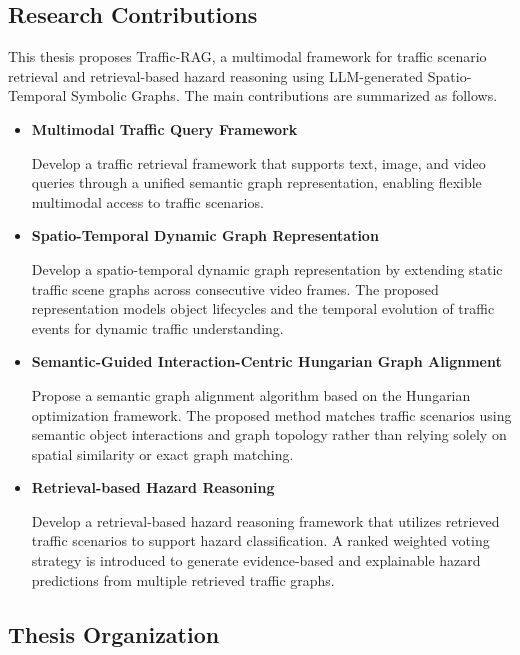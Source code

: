 \documentclass[a4paper, 11pt]{article} %
\begin{document}
\subsection{Research Contributions}

This thesis proposes Traffic-RAG, a multimodal framework for traffic scenario retrieval and retrieval-based hazard reasoning using LLM-generated Spatio-Temporal Symbolic Graphs. The main contributions are summarized as follows.

\begin{itemize}

\item \textbf{Multimodal Traffic Query Framework}

Develop a traffic retrieval framework that supports text, image, and video queries through a unified semantic graph representation, enabling flexible multimodal access to traffic scenarios.

\item \textbf{Spatio-Temporal Dynamic Graph Representation}

Develop a spatio-temporal dynamic graph representation by extending static traffic scene graphs across consecutive video frames. The proposed representation models object lifecycles and the temporal evolution of traffic events for dynamic traffic understanding.

\item \textbf{Semantic-Guided Interaction-Centric Hungarian Graph Alignment}

Propose a semantic graph alignment algorithm based on the Hungarian optimization framework. The proposed method matches traffic scenarios using semantic object interactions and graph topology rather than relying solely on spatial similarity or exact graph matching.

\item \textbf{Retrieval-based Hazard Reasoning}

Develop a retrieval-based hazard reasoning framework that utilizes retrieved traffic scenarios to support hazard classification. A ranked weighted voting strategy is introduced to generate evidence-based and explainable hazard predictions from multiple retrieved traffic graphs.

\end{itemize}
\subsection{Thesis Organization}
\end{document}
